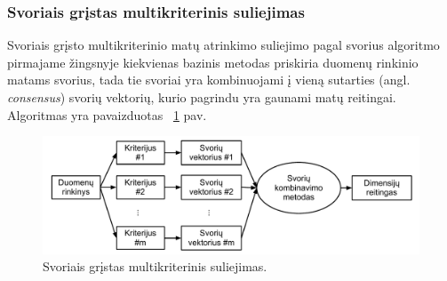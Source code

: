 \subsubsection{Svoriais grįstas multikriterinis suliejimas}

Svoriais grįsto multikriterinio matų atrinkimo suliejimo pagal svorius algoritmo pirmajame žingsnyje kiekvienas bazinis metodas priskiria duomenų rinkinio matams svorius, tada tie svoriai yra kombinuojami į vieną sutarties (angl. \textit{consensus}) svorių vektorių, kurio pagrindu yra gaunami matų reitingai. Algoritmas yra pavaizduotas ~\ref{fig:figure4} pav.
\begin{figure}
 \centering
 \includegraphics[width=1\textwidth]{../bachelor/images/score_based_fusion.pdf}
 \caption{Svoriais grįstas multikriterinis suliejimas.}
 \label{fig:figure4}
\end{figure}
